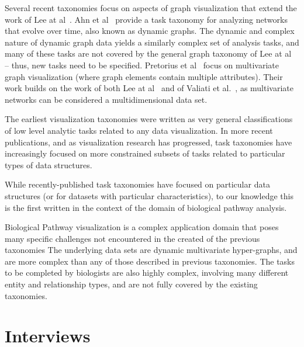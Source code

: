 Several recent taxonomies focus on aspects of graph visualization that extend the work of Lee at al~\cite{Lee2006}.
Ahn et al~\cite{Ahn2014} provide a task taxonomy for analyzing networks that evolve over time, also known as dynamic graphs.
The dynamic and complex nature of dynamic graph data yields a similarly complex set of analysis tasks, and many of these tasks are not covered by the general graph taxonomy of Lee at al~\cite{Lee2006} -- thus, new tasks need to be specified.
Pretorius et al~\cite{Pretorius2014} focus on multivariate graph visualization (where graph elements contain multiple attributes).
Their work builds on the work of both Lee at al~\cite{Lee2006} and of Valiati et al.~\cite{Valiati2006}, as multivariate networks can be considered a multidimensional data set.

The earliest visualization taxonomies were written as very general classifications of low level analytic tasks related to any data visualization.
In more recent publications, and as visualization research has progressed, task taxonomies have increasingly focused on more constrained subsets of tasks related to particular types of data structures.

While recently-published task taxonomies have focused on particular data structures (or for datasets with particular characteristics), to our knowledge this is the first written in the context of the domain of biological pathway analysis.


Biological Pathway visualization is a complex application domain that poses many specific challenges not encountered in the created of the previous taxonomies
The underlying data sets are dynamic multivariate hyper-graphs, and are more complex than any of those described in previous taxonomies.
The tasks to be completed by biologists are also highly complex, involving many different entity and relationship types, and are not fully covered by the existing taxonomies.


\section{Interviews}

